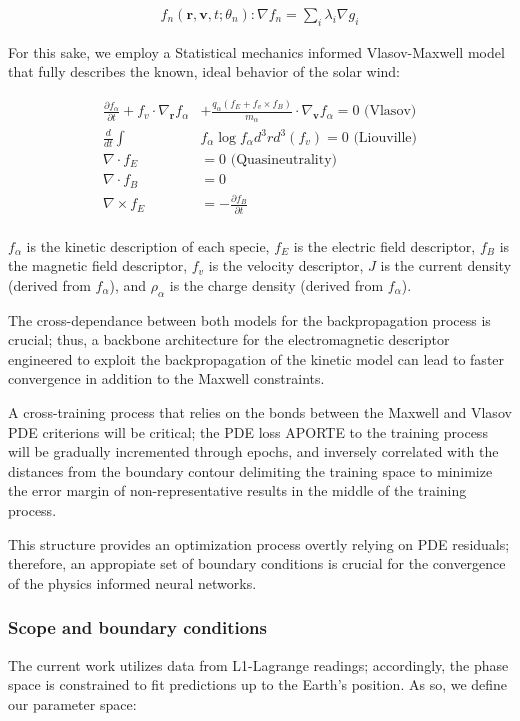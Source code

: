 \documentclass[12pt]{article}
\begin{document}
\begin{align*}
    f_n(\mathbf{r}, \mathbf{v}, t; \theta_n): \nabla f_n = \sum_{i} \lambda_i \nabla g_i
\end{align*}

For this sake, we employ a Statistical mechanics informed Vlasov-Maxwell model that fully describes the known, ideal behavior of the solar wind:

\begin{align*}
    \frac{\partial f_\alpha}{\partial t} + f_v \cdot \nabla_{\mathbf{r}} f_\alpha &+ \frac{q_\alpha ( f_E + f_v \times f_B)}{m_\alpha} \cdot \nabla_{\mathbf{v}} f_\alpha = 0 \text{ (Vlasov)}\\
\frac{d}{dt} \int &f_\alpha \log f_\alpha d^3r d^3(f_v) = 0 \text{ (Liouville)}\\
\nabla \cdot f_E &= 0 \text{ (Quasineutrality)}\\
\nabla \cdot f_B &= 0 \\
\nabla \times f_E &= - \frac{\partial f_B}{\partial t} \\
\end{align*}

$f_\alpha$ is the kinetic description of each specie, $f_E$ is the electric field descriptor, $f_B$ is the magnetic field descriptor, $f_v$ is the velocity descriptor, $J$ is the current density (derived from $f_\alpha$), and $\rho_\alpha$ is the charge density (derived from $f_\alpha$).

The cross-dependance between both models for the backpropagation process is crucial; thus, a backbone architecture for the electromagnetic descriptor engineered to exploit the backpropagation of the kinetic model can lead to faster convergence in addition to the Maxwell constraints.

A cross-training process that relies on the bonds between the Maxwell and Vlasov PDE criterions will be critical; the PDE loss APORTE to the training process will be gradually incremented through epochs, and inversely correlated with the distances from the boundary contour delimiting the training space to minimize the error margin of non-representative results in the middle of the training process.

This structure provides an optimization process overtly relying on PDE residuals; therefore, an appropiate set of boundary conditions is crucial for the convergence of the physics informed neural networks.

\subsubsection{Scope and boundary conditions}
The current work utilizes data from L1-Lagrange readings; accordingly, the phase space is constrained to fit predictions up to the Earth's position. As so, we define our parameter space:
\end{document}
